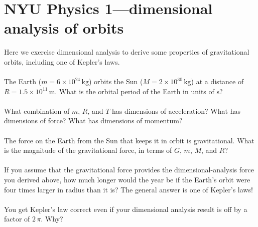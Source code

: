 \documentclass[12pt]{article}
\newcommand{\kg}{\mathrm{kg}}
\newcommand{\m}{\mathrm{m}}
\newcommand{\s}{\mathrm{s}}
\newcounter{problem}
\begin{document}
\sloppy\sloppypar\raggedbottom\frenchspacing\thispagestyle{empty}

\section*{NYU Physics 1---dimensional analysis of orbits}

Here we exercise dimensional analysis to derive some properties of
gravitational orbits, including one of Kepler's laws.

\paragraph{\theproblem}%
The Earth ($m= 6\times 10^{24}\,\kg$) orbits the Sun ($M= 2\times
10^{30}\,\kg$) at a distance of $R= 1.5\times 10^{11}\,\m$.  What is
the orbital period of the Earth in units of $\s$?

\paragraph{\theproblem}%
What combination of $m$, $R$, and $T$ has dimensions of acceleration?
What has dimensions of force?  What has dimensions of momentum?

\paragraph{\theproblem}%
The force on the Earth from the Sun that keeps it in orbit is
gravitational.  What is the magnitude of the gravitational force, in
terms of $G$, $m$, $M$, and $R$?

\paragraph{\theproblem}%
If you assume that the gravitational force provides the
dimensional-analysis force you derived above, how much longer would
the year be if the Earth's orbit were four times larger in radius than
it is?  The general answer is one of Kepler's laws!

\paragraph{\theproblem}%
You get Kepler's law correct even if your dimensional analysis result
is off by a factor of $2\,\pi$.  Why?
\end{document}
